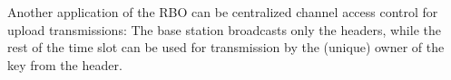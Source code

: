 Another application of the RBO can be centralized channel access
control for upload transmissions: 
The base station broadcasts only the headers,
while the rest of the time slot can be used for
transmission by the (unique) owner of the key from the header.
 
